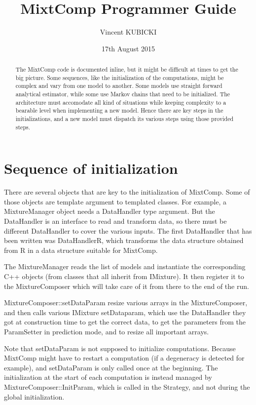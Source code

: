 \documentclass{article}
\title{MixtComp Programmer Guide}
\author{Vincent KUBICKI}
\date{17th August 2015}
\begin{document}
\maketitle

\begin{abstract}

The MixtComp code is documented inline, but it might be difficult at times to get the big picture. Some sequences, like the initialization of the computations, might be complex and vary from one model to another. Some models use straight forward analytical estimator, while some use Markov chains that need to be initialized. The architecture must accomodate all kind of situations while keeping complexity to a bearable level when implementing a new model. Hence there are key steps in the initializations, and a new model must dispatch its various steps using those provided steps.

\end{abstract}

\section{Sequence of initialization}

There are several objects that are key to the initialization of MixtComp. Some of those objects are template argument to templated classes. For example, a MixtureManager object needs a DataHandler type argument. But the DataHandler is an interface to read and transform data, so there must be different DataHandler to cover the various inputs. The first DataHandler that has been written was DataHandlerR, which transforms the data structure obtained from R in a data structure suitable for MixtComp.

The MixtureManager reads the list of models and instantiate the corresponding C++ objects (from classes that all inherit from IMixture). It then register it to the MixtureComposer which will take care of it from there to the end of the run.

MixtureComposer::setDataParam resize various arrays in the MixtureComposer, and then calls various IMixture setDataparam, which use the DataHandler they got at construction time to get the correct data, to get the parameters from the ParamSetter in prediction mode, and to resize all important arrays.

Note that setDataParam is not supposed to initialize computations. Because MixtComp might have to restart a computation (if a degeneracy is detected for example), and setDataParam is only called once at the beginning. The initialization at the start of each computation is instead managed by MixtureComposer::InitParam, which is called in the Strategy, and not during the global initialization.
\end{document}
